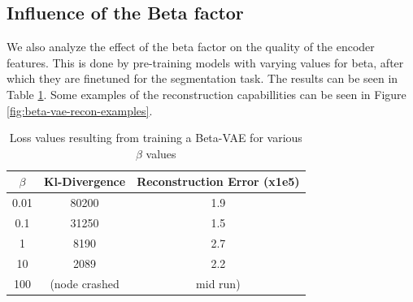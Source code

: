 \subsection{Influence of the Beta factor}
We also analyze the effect of the beta factor on the quality of the encoder features. This is done by pre-training models with varying values for beta, after which they are finetuned for the segmentation task. The results can be seen in Table \ref{tab:beta-vae-loss-values}. Some examples of the reconstruction capabillities can be seen in Figure \ref{fig:beta-vae-recon-examples}.

\begin{table}[!ht]
    \centering
    \caption{Loss values resulting from training a Beta-VAE for various $\beta$ values}
    \label{tab:beta-vae-loss-values}
    \begin{tabular}{ccc}
        \hline
        $\beta$ & Kl-Divergence & Reconstruction Error (x1e5) \\
        \hline
        0.01    & 80200         & 1.9                         \\
        0.1     & 31250         & 1.5                         \\
        1       & 8190          & 2.7                         \\
        10      & 2089          & 2.2                         \\
        100     & (node crashed & mid run)                    \\
        \hline
    \end{tabular}
\end{table}

